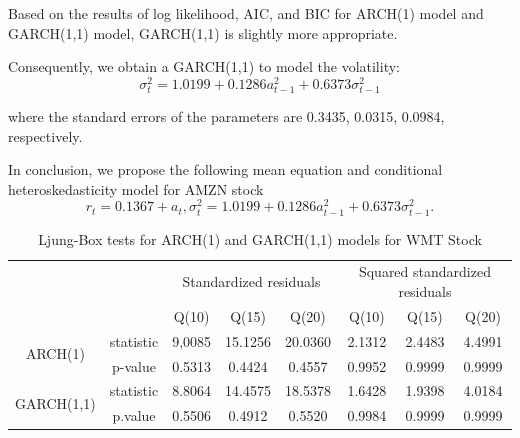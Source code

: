 \documentclass[paper=a4, fontsize=13pt]{article}
\begin{document}
Based on the results of log likelihood, AIC, and BIC for ARCH(1) model and GARCH(1,1) model, GARCH(1,1) is slightly more appropriate.

Consequently, we obtain a GARCH(1,1) to model the volatility:
\[ \sigma_t^2 = 1.0199+0.1286 a_{t-1}^2+0.6373\sigma_{t-1}^2 \]

where the standard errors of the parameters are 0.3435, 0.0315, 0.0984, respectively.

In conclusion, we propose the following mean equation and conditional heteroskedasticity model for AMZN stock
\[ r_t = 0.1367+a_t, \sigma_t^2 = 1.0199+0.1286a_{t-1}^2+0.6373\sigma_{t-1}^2. \]

\begin{table}[!htbp] \centering 
  \caption{Ljung-Box tests for ARCH(1) and GARCH(1,1) models for WMT Stock} 
  \label{} 
\begin{tabular}{cc|cccccc} 
\\[-1.8ex]\hline 
\hline
& & \multicolumn{3}{c}{Standardized residuals} & \multicolumn{3}{c}{Squared standardized residuals} \\
& & Q(10) & Q(15) & Q(20) & Q(10) & Q(15) & Q(20) \\
\hline 
\multirow{2}{*}{ARCH(1)} & statistic & 9,0085 & 15.1256 & 20.0360 & 2.1312 & 2.4483 & 4.4991 \\
& p-value & 0.5313 & 0.4424 & 0.4557 & 0.9952 & 0.9999 & 0.9999 \\
\multirow{2}{*}{GARCH(1,1)} & statistic & 8.8064 & 14.4575 & 18.5378 & 1.6428 & 1.9398 & 4.0184 \\
& p.value & 0.5506 & 0.4912 & 0.5520 & 0.9984 & 0.9999 & 0.9999 \\
\hline
\hline 
\end{tabular} 
\end{table} 
\end{document}
